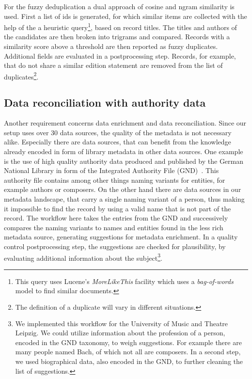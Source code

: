 \documentclass[english]{lni}
\begin{document}
For the fuzzy deduplication a dual approach of cosine and ngram similarity is
used. First a list of ids is generated, for which similar items are collected
with the help of the a heuristic query\footnote{This query uses Lucene's \emph{MoreLikeThis} facility which uses a \emph{bag-of-words} model to find similar documents.}, based on record titles.
The titles and authors of the candidates are then broken into trigrams
and compared. Records with a similarity score above a threshold are then
reported as fuzzy duplicates.  Additional fields are evaluated in a postprocessing step. Records, for example,
that do not share a similar edition statement are removed from the list of
duplicates\footnote{The definition of a duplicate will vary in different situations.}.

\subsection{Data reconciliation with authority data}

Another requirement concerns data enrichment and data reconciliation.
Since our setup uses over 30 data sources, the quality of the metadata
is not necessary alike. Especially there are data sources, that can benefit from
the knowledge already encoded in form of library metadata in other
data sources. One example is the use of high quality authority data produced and
published by the German National Library in form of the Integrated Authority File (GND)~\cite{behrens2011gemeinsame}.
This authority file contains among other things naming variants for entities,
for example authors or composers. On the other hand there are data sources
in our metadata landscape, that carry a single naming variant of a person,
thus making it impossible to find the record by using a valid name that
is not part of the record. The workflow here takes the entries from the GND
and successively compares the naming variants to names and entities found in the
less rich metadata source, generating suggestions for metadata enrichment.
In a quality control postprocessing step, the suggestions are checked for plausibility, by
evaluating additional information about the subject\footnote{We implemented this workflow for the University of Music and Theatre Leipzig.
We could utilize information about the profession of a person, encoded in the GND taxonomy, to
weigh suggestions. For example there are many people named Bach, of which not all are composers. In a second step,
we used biographical data, also encoded in the GND, to further cleaning the list of suggestions.}.
\end{document}
